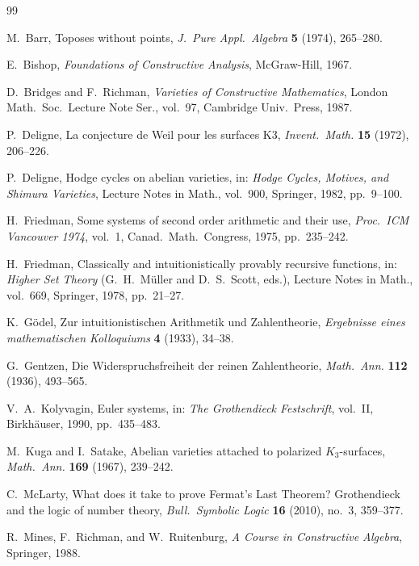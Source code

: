 \documentclass[11pt,a4paper]{article}
\theoremstyle{plain}
\theoremstyle{definition}
\begin{document}
\begin{thebibliography}{99}

M.~Barr,
Toposes without points,
\emph{J.~Pure Appl.\ Algebra} \textbf{5} (1974), 265--280.

E.~Bishop,
\emph{Foundations of Constructive Analysis},
McGraw-Hill, 1967.

D.~Bridges and F.~Richman,
\emph{Varieties of Constructive Mathematics},
London Math.\ Soc.\ Lecture Note Ser., vol.~97, Cambridge Univ.\ Press, 1987.

P.~Deligne,
La conjecture de Weil pour les surfaces K3,
\emph{Invent.\ Math.} \textbf{15} (1972), 206--226.

P.~Deligne,
Hodge cycles on abelian varieties,
in: \emph{Hodge Cycles, Motives, and Shimura Varieties}, Lecture Notes in Math., vol.~900, Springer, 1982, pp.~9--100.

H.~Friedman,
Some systems of second order arithmetic and their use,
\emph{Proc.\ ICM Vancouver 1974}, vol.~1, Canad.\ Math.\ Congress, 1975, pp.~235--242.

H.~Friedman,
Classically and intuitionistically provably recursive functions,
in: \emph{Higher Set Theory} (G.~H.~M\"uller and D.~S.~Scott, eds.),
Lecture Notes in Math., vol.~669, Springer, 1978, pp.~21--27.

K.~G\"odel,
Zur intuitionistischen Arithmetik und Zahlentheorie,
\emph{Ergebnisse eines mathematischen Kolloquiums} \textbf{4} (1933), 34--38.

G.~Gentzen,
Die Widerspruchsfreiheit der reinen Zahlentheorie,
\emph{Math.\ Ann.} \textbf{112} (1936), 493--565.

V.~A.~Kolyvagin,
Euler systems,
in: \emph{The Grothendieck Festschrift}, vol.~II, Birkh\"auser, 1990, pp.~435--483.

M.~Kuga and I.~Satake,
Abelian varieties attached to polarized $K_3$-surfaces,
\emph{Math.\ Ann.} \textbf{169} (1967), 239--242.

C.~McLarty,
What does it take to prove Fermat's Last Theorem? Grothendieck and the logic of number theory,
\emph{Bull.\ Symbolic Logic} \textbf{16} (2010), no.~3, 359--377.

R.~Mines, F.~Richman, and W.~Ruitenburg,
\emph{A Course in Constructive Algebra},
Springer, 1988.


\end{thebibliography}
\end{document}
